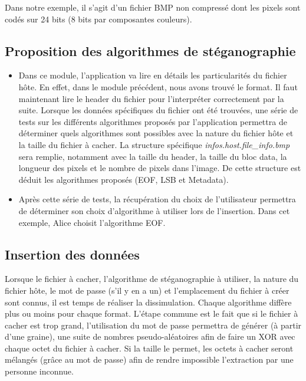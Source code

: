 \documentclass[11pt]{article}
\begin{document}
Dans notre exemple, il s'agit d'un fichier BMP non compressé dont les 
pixels sont codés sur 24 bits (8 bits par composantes couleurs). 

\subsection{Proposition des algorithmes de stéganographie}

\begin{itemize}
\item Dans ce module, l'application va lire en détails les particularités du fichier 
hôte. En effet, dans le module précédent, nous avons trouvé le format. Il 
faut maintenant lire le header du fichier pour l'interpréter correctement 
par la suite. Lorsque les données spécifiques du fichier ont été trouvées, 
une série de tests sur les différents algorithmes proposés par l'application
permettra de déterminer quels algorithmes sont possibles avec la nature 
du fichier hôte et la taille du fichier à cacher. 
\newline 
La structure spécifique \textit{infos.host.file\_info.bmp} sera remplie, 
notamment avec la taille du header, la taille du bloc data, la longueur 
des pixels et le nombre de pixels dans l'image. De cette structure
est déduit les algorithmes proposés (EOF, LSB et Metadata). 
\newline
\item Après cette série de tests, la récupération du choix de l'utilisateur 
permettra de déterminer son choix d'algorithme à utiliser lors de l'insertion. 
\newline 
Dans cet exemple, Alice choisit l'algorithme EOF. 
\end{itemize}

\subsection{Insertion des données}

Lorsque le fichier à cacher, l'algorithme de stéganographie à utiliser, 
la nature du fichier hôte, le mot de passe (s'il y en a un) et l'emplacement 
du fichier à créer sont connus, il est temps de réaliser la dissimulation. 
Chaque algorithme diffère plus ou moins pour chaque format. 
L'étape commune est le fait que si le fichier à cacher est trop grand, 
l'utilisation du mot de passe permettra de générer (à partir d'une graine), 
une suite de nombres pseudo-aléatoires afin de faire un XOR avec chaque 
octet du fichier à cacher. Si la taille le permet, les octets à cacher 
seront mélangés (grâce au mot de passe) afin de rendre impossible l'extraction 
par une personne inconnue. 
\end{document}
